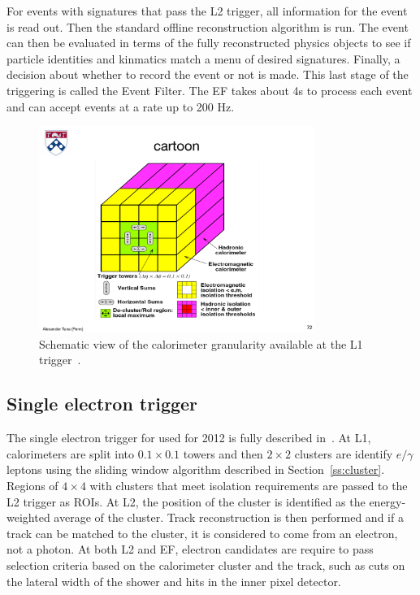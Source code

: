 For events with signatures that pass the L2 trigger, all information for the event is read out. Then the standard offline reconstruction algorithm is run. The event can then be evaluated in terms of the fully reconstructed physics objects to see if particle identities and kinmatics match a menu of desired signatures. Finally, a decision about whether to record the event or not is made. This last stage of the triggering is called the Event Filter. The EF takes about 4s to process each event and can accept events at a rate up to 200 Hz.


\begin{figure}[tp]
  \centering
  \includegraphics[width=0.80\textwidth]{fig/atlas/cartoonL1.pdf}
  \caption{Schematic view of the calorimeter granularity available at the L1 trigger~\cite{TDR-L1}.}
  \label{fig:l1}
\end{figure}
\subsection{Single electron trigger}
The single electron trigger for used for 2012 is fully described in~\cite{eltrig}. At L1, calorimeters are split into $0.1\times0.1$ towers and then $2\times 2$ clusters are identify $e/\gamma$ leptons using the sliding window algorithm described in Section~\ref{ss:cluster}. Regions of $4\times 4$ with clusters that meet isolation requirements are passed to the L2 trigger as ROIs. At L2, the position of the cluster is identified as the energy-weighted average of the cluster. Track reconstruction is then performed and if a track can be matched to the cluster, it is considered to come from an electron, not a photon. At both L2 and EF, electron candidates are require to pass selection criteria based on the calorimeter cluster and the track, such as cuts on the lateral width of the shower and hits in the inner pixel detector.

